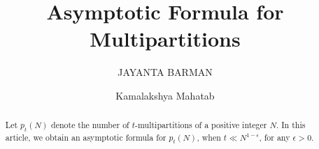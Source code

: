 \documentclass[11pt]{amsart}
\theoremstyle{plain}
\numberwithin{equation}{section}
\begin{document}
	\title[ Asymptotic Formula for Multipartitions
	]
	{Asymptotic Formula for Multipartitions} 
	\author{JAYANTA BARMAN}
	\address{JAYANTA BARMAN\\ Department of Mathematics \\
		Indian Institute of Technology Kharagpur \\
		Kharagpur-721302,  India.} 
	
	\author{Kamalakshya Mahatab}
	\address{Kamalakshya Mahatab\\ Department of Mathematics \\
		Indian Institute of Technology Kharagpur \\
		Kharagpur-721302,  India.} 
	
	\begin{abstract} 
		Let $p_t(N)$ denote the number of $t$-multipartitions of a positive integer $N$. In this article, we obtain an asymptotic formula for $p_t(N)$, when $t \ll N^{1 - \epsilon}$, for any $\epsilon > 0$.
	\end{abstract}
	\maketitle
\end{document}

